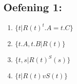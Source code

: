 \documentclass[../Oefenzitting5.tex]{subfiles}
\begin{document}
  \subsection{Oefening 1:}
    \begin{enumerate}
      \item

        $
          \{ t | R(t) ^ t.A = t.C \}
        $
      \item
        $
          \{ t.A, t.B | R(t) \}
        $
      \item
        $
          \{ t, s | R(t) ^ S(s)  \}
        $
      \item
        $
          \{ t | R(t) v S(t)  \}
        $


    \end{enumerate}
\end{document}
